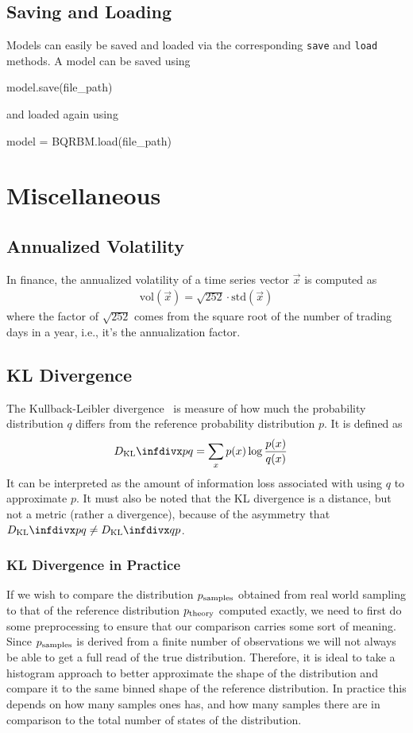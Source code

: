 \subsection{Saving and Loading}
Models can easily be saved and loaded via the corresponding \texttt{save} and \texttt{load} methods.
A model can be saved using
\begin{python}
model.save(file_path)
\end{python}
and loaded again using
\begin{python}
model = BQRBM.load(file_path)
\end{python}

\section{Miscellaneous}
\subsection{Annualized Volatility}\label{app:annualized_volatility}
In finance, the annualized volatility of a time series vector \( \vec{x} \) is computed as
\begin{align}
    \text{vol}(\vec{x}) = \sqrt{252} \cdot \text{std}(\vec{x})
\end{align}
where the factor of \( \sqrt{252} \) comes from the square root of the number of trading days in a year, i.e., it's the annualization factor.

\subsection{KL Divergence}\label{app:kl_divergence}
The Kullback-Leibler divergence~\cite{kullback_1951} is measure of how much the probability distribution \( q \) differs from the reference probability distribution \( p \).
It is defined as
\begin{align}
    \DKL{p}{q}
        &= \sum_{x} p(x) \log\frac{p(x)}{q(x)}
\end{align}
It can be interpreted as the amount of information loss associated with using \( q \) to approximate \( p \).
It must also be noted that the KL divergence is a distance, but not a metric (rather a divergence), because of the asymmetry that \( \DKL{p}{q} \ne \DKL{q}{p} \).

\subsubsection{KL Divergence in Practice}\label{app:kl_divergence_in_practice}
If we wish to compare the distribution \( p_{\text{samples}} \) obtained from real world sampling to that of the reference distribution \( p_{\text{theory}} \) computed exactly, we need to first do some preprocessing to ensure that our comparison carries some sort of meaning.
Since \( p_{\text{samples}} \) is derived from a finite number of observations we will not always be able to get a full read of the true distribution.
Therefore, it is ideal to take a histogram approach to better approximate the shape of the distribution and compare it to the same binned shape of the reference distribution.
In practice this depends on how many samples ones has, and how many samples there are in comparison to the total number of states of the distribution.

